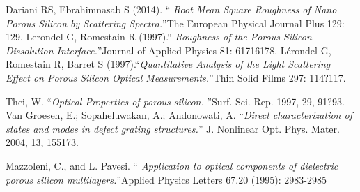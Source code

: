 \documentclass{article}
\begin{document}
\begin{thebibliography}{X}
 Dariani RS, Ebrahimnasab S (2014). \textquotedblleft
  \emph{Root Mean Square Roughness of Nano Porous Silicon by
    Scattering Spectra.}\textquotedblright The
  European Physical Journal Plus 129: 129.
 Lerondel G, Romestain R (1997).\textquotedblleft
  \emph{Roughness of the Porous Silicon Dissolution
    Interface.}\textquotedblright Journal of Applied Physics 81:
  61716178.
 Lérondel G, Romestain R, Barret S
  (1997).\textquotedblleft \emph{Quantitative Analysis of the Light
    Scattering Effect on Porous Silicon
    Optical Measurements.}\textquotedblright Thin Solid Films 297:
  114?117.

 Thei, W. \textquotedblleft \emph{Optical Properties of porous silicon.}
\textquotedblright Surf. Sci. Rep. 1997, 29, 91?93.
 Van Groesen, E.; Sopaheluwakan, A.; Andonowati,
  A. \textquotedblleft  \emph{Direct characterization of states and
    modes in defect grating structures.}\textquotedblright
  J. Nonlinear Opt. Phys. Mater. 2004, 13, 155173.

 Mazzoleni, C., and L. Pavesi. \textquotedblleft
  \emph{Application to optical components of dielectric porous silicon
    multilayers.}\textquotedblright Applied Physics Letters 67.20
  (1995): 2983-2985

\end{thebibliography}
\end{document}

